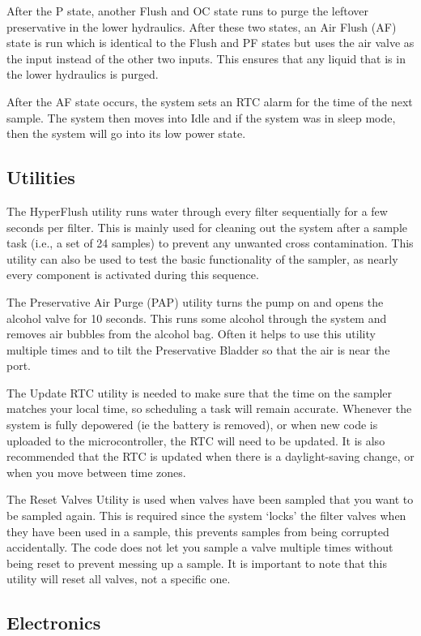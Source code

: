 \documentclass[11pt, letterpaper]{article}
\begin{document}
After the P state, another Flush and OC state runs to purge the leftover preservative in the lower hydraulics. After these two states, an Air Flush (AF) state is run which is identical to the Flush and PF states but uses the air valve as the input instead of the other two inputs. This ensures that any liquid that is in the lower hydraulics is purged. 

After the AF state occurs, the system sets an RTC alarm for the time of the next sample. The system then moves into Idle and if the system was in sleep mode, then the system will go into its low power state.

\subsection{Utilities}
The HyperFlush utility runs water through every filter sequentially for a few seconds per filter. This is mainly used for cleaning out the system after a sample task (i.e., a set of 24 samples) to prevent any unwanted cross contamination. This utility can also be used to test the basic functionality of the sampler, as nearly every component is activated during this sequence. 

The Preservative Air Purge (PAP) utility turns the pump on and opens the alcohol valve for 10 seconds. This runs some alcohol through the system and removes air bubbles from the alcohol bag. Often it helps to use this utility multiple times and to tilt the Preservative Bladder so that the air is near the port.

The Update RTC utility is needed to make sure that the time on the sampler matches your local time, so scheduling a task will remain accurate. Whenever the system is fully depowered (ie the battery is removed), or when new code is uploaded to the microcontroller, the RTC will need to be updated. It is also recommended that the RTC is updated when there is a daylight-saving change, or when you move between time zones.

The Reset Valves Utility is used when valves have been sampled that you want to be sampled again. This is required since the system ‘locks’ the filter valves when they have been used in a sample, this prevents samples from being corrupted accidentally. The code does not let you sample a valve multiple times without being reset to prevent messing up a sample. It is important to note that this utility will reset all valves, not a specific one.

\subsection{Electronics}
\end{document}
